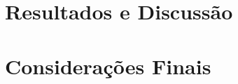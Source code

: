 \chapter[Resultados e Discussão]{Resultados e Discussão}



\chapter[Considerações Finais]{Considerações Finais}